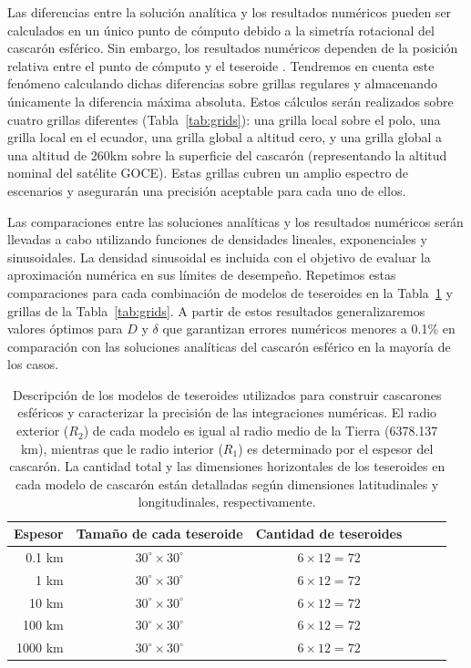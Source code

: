 Las diferencias entre la solución analítica y los resultados numéricos pueden
ser calculados en un único punto de cómputo debido a la simetría rotacional del
cascarón esférico.
Sin embargo, los resultados numéricos dependen de la posición relativa entre el
punto de cómputo y el teseroide \citep{ku1977, asgharzadeh2007, uieda2016}.
Tendremos en cuenta este fenómeno calculando dichas diferencias sobre grillas
regulares y almacenando únicamente la diferencia máxima absoluta.
Estos cálculos serán realizados sobre cuatro grillas diferentes
(Tabla~\ref{tab:grids}):
una grilla local sobre el polo, una grilla local en el ecuador, una grilla
global a altitud cero, y una grilla global a una altitud de 260km sobre la
superficie del cascarón (representando la altitud nominal del satélite GOCE).
Estas grillas cubren un amplio espectro de escenarios y asegurarán una
precisión aceptable para cada uno de ellos.

Las comparaciones entre las soluciones analíticas y los resultados numéricos
serán llevadas a cabo utilizando funciones de densidades lineales,
exponenciales y sinusoidales.
La densidad sinusoidal es incluida con el objetivo de evaluar la aproximación
numérica en sus límites de desempeño.
Repetimos estas comparaciones para cada combinación de modelos de teseroides
en la Tabla~\ref{tab:shell-models} y grillas de la Tabla~\ref{tab:grids}.
A partir de estos resultados generalizaremos valores óptimos para $D$
y $\delta$ que garantizan errores numéricos menores a 0.1\% en comparación con
las soluciones analíticas del cascarón esférico en la mayoría de los casos.

\begin{table}
\centering
\begin{tabular}{rccccc}
    Espesor & Tamaño de cada teseroide  & Cantidad de teseroides \\ \hline
    0.1 km  & $30^\circ \times 30^\circ$ & $6 \times 12 = 72$ \\
    1 km    & $30^\circ \times 30^\circ$ & $6 \times 12 = 72$ \\
    10 km   & $30^\circ \times 30^\circ$ & $6 \times 12 = 72$ \\
    100 km  & $30^\circ \times 30^\circ$ & $6 \times 12 = 72$ \\
    1000 km & $30^\circ \times 30^\circ$ & $6 \times 12 = 72$ \\
\end{tabular}
\caption{
    Descripción de los modelos de teseroides utilizados para construir
    cascarones esféricos y caracterizar la precisión de las integraciones
    numéricas.
    El radio exterior ($R_2$) de cada modelo es igual al radio medio de la
    Tierra (6378.137 km), mientras que le radio interior ($R_1$) es determinado
    por el espesor del cascarón.
    La cantidad total y las dimensiones horizontales de los teseroides en cada
    modelo de cascarón están detalladas según dimensiones latitudinales
    y longitudinales, respectivamente.
    \newline
}
\label{tab:shell-models}
\end{table}


